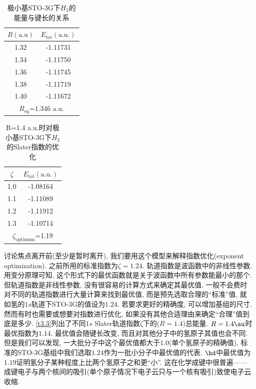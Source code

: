 \begin{table}[H]
	\centering
	\caption{极小基STO-3G下$H_2$的能量与键长的关系}
	\begin{tabular}{cc}
		\hline
		$R \mathrm{(a.u)}$ & $E_\mathrm{tot}\mathrm{(a.u.)}$\\\hline
		1.32      & -1.11731\\
		1.34     & -1.11750\\
		1.36     & -1.11745\\
		1.38     & -1.11719\\
		1.40     & -1.11672\\\hline
		\multicolumn{2}{c}{$R_\mathrm{eq}$=1.346 a.u.}
	\end{tabular}
	\label{t3.2}
\end{table}
\begin{table}[H]
	\centering
	\caption{R=1.4 a.u.时对极小基STO-3G下$H_2$的Slater指数的优化}
	\begin{tabular}{cc}
		\hline
		$\zeta$ & $E_\mathrm{tot} \mathrm{(a.u.)}$\\\hline
		1.0      & -1.08164\\
		1.1     & -1.11089\\
		1.2     & -1.11912\\
		1.3     & -1.10714\\\hline
		\multicolumn{2}{c}{$\zeta_\mathrm{optimum}$=1.19}
	\end{tabular}
	\label{t3.3}
\end{table}
讨论焦点离开前(至少是暂时离开), 
我们要用这个模型来解释指数优化(exponent optimization). 
之前所用的标准指数为$\zeta=1.24$. 
轨道指数是波函数中的非线性参数. 
用变分原理可知, 
这个形式下的最优函数就是关于波函数中所有参数能最小的那个. 
但轨道指数是非线性参数, 
没有很容易的计算方式来确定其最优值. 
一般不会费时对不同的轨道指数进行大量计算来找到最优值, 
而是预先选取合理的``标准''值, 
就如氢的$1s$轨道下STO-3G的值设为$1.24$. 
若要求更好的精确度, 
可以增加基组的尺寸. 
然而有时也需要或想要对指数进行优化, 
如果没有其他合适理由来确定``合理''值到底是多少. 
\autoref{t3.3}列出了不同$1s$ Slater轨道指数$\zeta$下的($R=1.4$)总能量. 
$R=1.4\au$时最优指数为$1.14$. 
最优值会随键长改变, 
而且对其他分子中的氢原子其值也会不同. 
但是我们可以发现, 
一大批分子中这个最优值都大于$1.0$(单个氢原子的精确值), 
标准的STO-3G基组中我们选取$1.24$作为一批小分子中最优值的代表. 
$\hd$中最优值为$1.19$证明氢分子某种程度上比两个氢原子之和更``小”. 
这在化学成键中很普遍——成键电子与两个核间的吸引(单个原子情况下电子云只与一个核有吸引)致使电子云收缩. 

